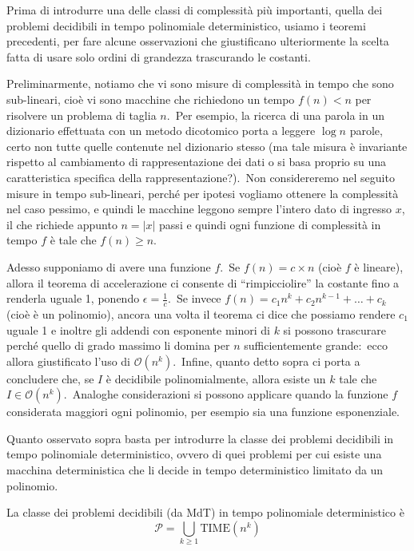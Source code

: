 \noindent Prima di introdurre una delle classi di complessità più importanti, quella dei problemi decidibili in tempo polinomiale deterministico, usiamo i teoremi precedenti, per fare alcune osservazioni che giustificano ulteriormente la scelta fatta di usare solo ordini di grandezza trascurando le costanti.

Preliminarmente, notiamo che vi sono misure di complessità in tempo che sono sub-lineari, cioè vi sono macchine che richiedono un tempo $f(n) < n$ per risolvere un problema di taglia $n$.\
Per esempio, la ricerca di una parola in un dizionario effettuata con un metodo dicotomico porta a leggere $\log n$ parole, certo non tutte quelle contenute nel dizionario stesso (ma tale misura è invariante rispetto al cambiamento di rappresentazione dei dati o si basa proprio su una caratteristica specifica della rappresentazione?).\
Non considereremo nel seguito misure in tempo sub-lineari, perché per ipotesi vogliamo ottenere la complessità nel caso pessimo, e quindi le macchine leggono sempre l'intero dato di ingresso $x$, il che richiede appunto $n = |x|$ passi e quindi ogni funzione di complessità in tempo $f$ è tale che $f(n) \geq n$.\

Adesso supponiamo di avere una funzione $f$.\
Se $f(n) = c \times n$ (cioè $f$ è lineare), allora il teorema di accelerazione ci consente di ``rimpicciolire'' la costante fino a renderla uguale 1, ponendo $\epsilon = \frac{1}{c}$.\
Se invece $f(n) = c_1n^k + c_2n^{k-1} + \dots + c_k$ (cioè è un polinomio), ancora una volta il teorema ci dice che possiamo rendere $c_1$ uguale 1 e inoltre gli addendi con esponente minori di $k$ si possono trascurare perché quello di grado massimo li domina per $n$ sufficientemente grande:\ ecco allora giustificato l'uso di $\mathcal{O}\left(n^k\right)$.\
Infine, quanto detto sopra ci porta a concludere che, se $I$ è decidibile polinomialmente, allora esiste un $k$ tale che $I \in \mathcal{O}\left(n^k\right)$.\
Analoghe considerazioni si possono applicare quando la funzione $f$ considerata maggiori ogni polinomio, per esempio sia una funzione esponenziale.

Quanto osservato sopra basta per introdurre la classe dei problemi decidibili in tempo polinomiale deterministico, ovvero di quei problemi per cui esiste una macchina deterministica che li decide in tempo deterministico limitato da un polinomio.

\begin{definition}
    La classe dei problemi decidibili (da MdT) in tempo polinomiale deterministico è
    \[\mathcal{P} = \bigcup_{k \geq 1} \mathrm{TIME}\left(n^k\right)\]
\end{definition}


